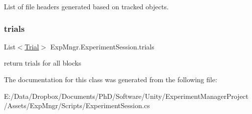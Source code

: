 List of file headers generated based on tracked objects. 

\mbox{\label{class_exp_mngr_1_1_experiment_session_a3fb8d4620a18f17723fc3308a4b5e249}} 
\subsubsection{\texorpdfstring{trials}{trials}}
{\footnotesize\ttfamily List$<$\hyperlink{class_exp_mngr_1_1_trial}{Trial}$>$ Exp\+Mngr.\+Experiment\+Session.\+trials\hspace{0.3cm}{\ttfamily [get]}}



return trials for all blocks 



The documentation for this class was generated from the following file\+:\begin{DoxyCompactItemize}
\item 
E\+:/\+Data/\+Dropbox/\+Documents/\+Ph\+D/\+Software/\+Unity/\+Experiment\+Manager\+Project/\+Assets/\+Exp\+Mngr/\+Scripts/Experiment\+Session.\+cs\end{DoxyCompactItemize}
